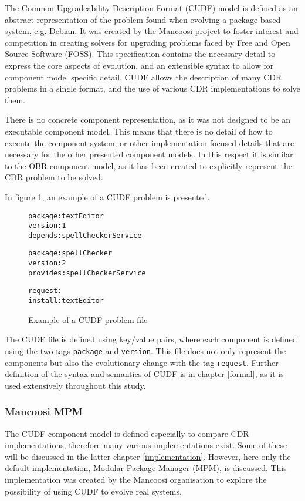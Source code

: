 The Common Upgradeability Description Format (CUDF) model is defined as an abstract representation of the problem found when evolving a package based system, e.g. Debian.
It was created by the Mancoosi project to foster interest and competition in creating solvers for upgrading problems faced by Free and Open Source Software (FOSS).
This specification contains the necessary detail to express the core aspects of evolution, and an extensible syntax to allow for component model specific detail. 
CUDF allows the description of many CDR problems in a single format, and the use of various CDR implementations to solve them. 

There is no concrete component representation, as it was not designed to be an executable component model.
This means that there is no detail of how to execute the component system, or other implementation focused details that are necessary for the other presented component models.
In this respect it is similar to the OBR component model, as it has been created to explicitly represent the CDR problem to be solved.

In figure \ref{CUDFmetadata}, an example of a CUDF problem is presented.

\begin{figure}[htp] 
\begin{center}
\begin{alltt}
package: textEditor
version: 1
depends: spellCheckerService

package: spellChecker
version: 2
provides: spellCheckerService

request:
install:textEditor

\end{alltt}
  \caption[CUDF meta-data file]{Example of a CUDF problem file}
  \label{CUDFmetadata}
\end{center}
\end{figure}

The CUDF file is defined using key/value pairs, where each component is defined using the two tags \texttt{package} and \texttt{version}.
This file does not only represent the components but also the evolutionary change with the tag \texttt{request}.
Further definition of the syntax and semantics of CUDF is in chapter \ref{formal}, as it is used extensively throughout this study.

\subsubsection{Mancoosi MPM}
The CUDF component model is defined especially to compare CDR implementations, therefore many various implementations exist.
Some of these will be discussed in the latter chapter \ref{implementation}.
However, here only the default implementation, Modular Package Manager \citep{abate2011} (MPM), is discussed.
This implementation was created by the Mancoosi organisation to explore the possibility of using CUDF to evolve real systems.

